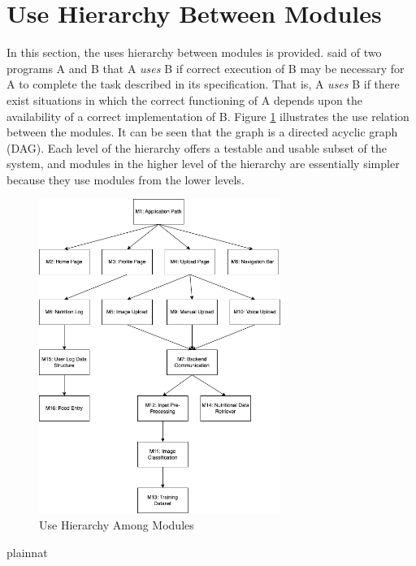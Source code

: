 \documentclass[12pt, titlepage]{article}
\begin{document}
\section{Use Hierarchy Between Modules} \label{SecUse}

In this section, the uses hierarchy between modules is
provided. \citet{Parnas1978} said of two programs A and B that A {\em uses} B if
correct execution of B may be necessary for A to complete the task described in
its specification. That is, A {\em uses} B if there exist situations in which
the correct functioning of A depends upon the availability of a correct
implementation of B.  Figure \ref{FigUH} illustrates the use relation between
the modules. It can be seen that the graph is a directed acyclic graph
(DAG). Each level of the hierarchy offers a testable and usable subset of the
system, and modules in the higher level of the hierarchy are essentially simpler
because they use modules from the lower levels.

\begin{figure}[H]
\centering
\includegraphics[width=0.7\textwidth]{use_hierarchy.png}
\caption{Use Hierarchy Among Modules}
\label{FigUH}
\end{figure}


 {plainnat}

\end{document}
